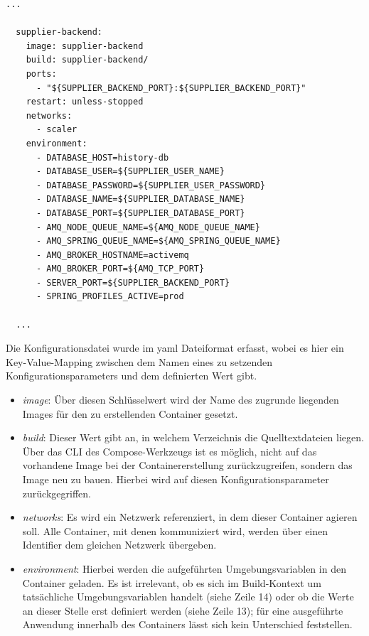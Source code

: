 \begin{lstlisting}[style=bashStyle,caption={Docker Compose - Ausschnitt Supplier Definition},label=lst:dockerCompose]
  ...

  supplier-backend:
    image: supplier-backend
    build: supplier-backend/
    ports:
      - "${SUPPLIER_BACKEND_PORT}:${SUPPLIER_BACKEND_PORT}"
    restart: unless-stopped
    networks:
      - scaler
    environment:
      - DATABASE_HOST=history-db
      - DATABASE_USER=${SUPPLIER_USER_NAME}
      - DATABASE_PASSWORD=${SUPPLIER_USER_PASSWORD}
      - DATABASE_NAME=${SUPPLIER_DATABASE_NAME}
      - DATABASE_PORT=${SUPPLIER_DATABASE_PORT}
      - AMQ_NODE_QUEUE_NAME=${AMQ_NODE_QUEUE_NAME}
      - AMQ_SPRING_QUEUE_NAME=${AMQ_SPRING_QUEUE_NAME}
      - AMQ_BROKER_HOSTNAME=activemq
      - AMQ_BROKER_PORT=${AMQ_TCP_PORT}
      - SERVER_PORT=${SUPPLIER_BACKEND_PORT}
      - SPRING_PROFILES_ACTIVE=prod
  
  ...

\end{lstlisting}

Die Konfigurationsdatei wurde im yaml Dateiformat erfasst, wobei es hier ein Key-Value-Mapping zwischen dem Namen eines zu setzenden Konfigurationsparameters und dem definierten Wert gibt.

\begin{itemize}
  \item \emph{image}: Über diesen Schlüsselwert wird der Name des zugrunde liegenden Images für den zu erstellenden Container gesetzt.
  \item \emph{build}: Dieser Wert gibt an, in welchem Verzeichnis die Quelltextdateien liegen. Über das CLI des Compose-Werkzeugs ist es möglich, nicht auf das vorhandene Image bei der Containererstellung zurückzugreifen, sondern das Image neu zu bauen. Hierbei wird auf diesen Konfigurationsparameter zurückgegriffen.
  \item \emph{networks}: Es wird ein Netzwerk referenziert, in dem dieser Container agieren soll. Alle Container, mit denen kommuniziert wird, werden über einen Identifier dem gleichen Netzwerk übergeben. 
  \item \emph{environment}: Hierbei werden die aufgeführten Umgebungsvariablen in den Container geladen. Es ist irrelevant, ob es sich im Build-Kontext um tatsächliche Umgebungsvariablen handelt (siehe Zeile 14) oder ob die Werte an dieser Stelle erst definiert werden (siehe Zeile 13); für eine ausgeführte Anwendung innerhalb des Containers lässt sich kein Unterschied feststellen.
\end{itemize}

